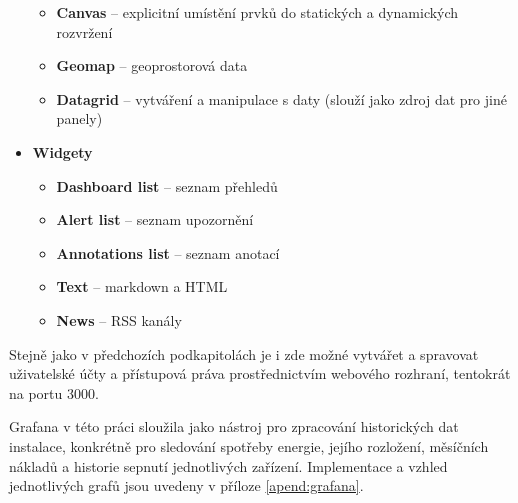 \begin{itemize}
\begin{itemize}
        \item \textbf{Canvas} – explicitní umístění prvků do statických a dynamických rozvržení
        \item \textbf{Geomap} – geoprostorová data
        \item \textbf{Datagrid} – vytváření a manipulace s daty (slouží jako zdroj dat pro jiné panely)
    \end{itemize}
    \item \textbf{Widgety}
    \begin{itemize}
        \item \textbf{Dashboard list} – seznam přehledů
        \item \textbf{Alert list} – seznam upozornění
        \item \textbf{Annotations list} – seznam anotací
        \item \textbf{Text} – markdown a HTML
        \item \textbf{News} – RSS kanály \newline
    \end{itemize}
\end{itemize}
Stejně jako v předchozích podkapitolách je i zde možné vytvářet a spravovat uživatelské účty a přístupová práva prostřednictvím webového rozhraní, tentokrát na portu 3000. \newline

\noindent Grafana v této práci sloužila jako nástroj pro zpracování historických dat instalace, konkrétně pro sledování spotřeby energie, jejího rozložení, měsíčních nákladů a historie sepnutí jednotlivých zařízení. Implementace a vzhled jednotlivých grafů jsou uvedeny v příloze \ref{apend:grafana}. 